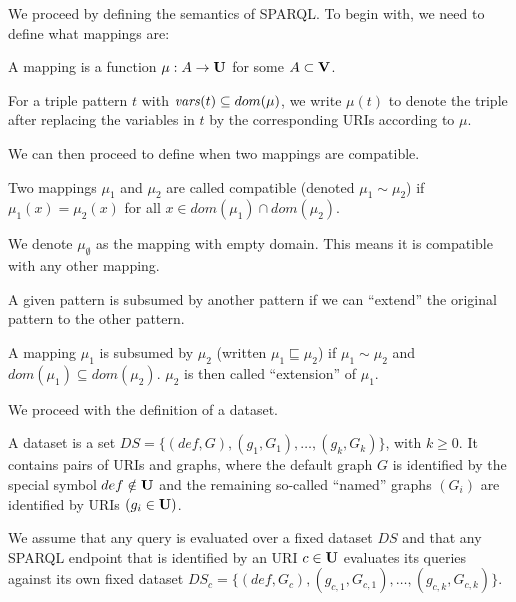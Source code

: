 We proceed by defining the semantics of SPARQL. To begin with, we need to define
what mappings are:
\begin{definition}
	A mapping is a function $\mu: A \rightarrow  \mathbf{U}$ for some $A \subset \mathbf{V}$. 
\end{definition}

For a triple pattern $t$ with $\mathit{vars}(t) \subseteq dom(\mu)$, we write $\mu(t)$ to 
denote the triple after replacing the variables in $t$ by the corresponding 
URIs according to $\mu$. 

We can then proceed to define when two mappings are compatible.
\begin{definition}
	Two mappings $\mu_1$ and $\mu_2$ are called compatible (denoted $\mu_1 \sim \mu_2$) 
	if $\mu_1(x) = \mu_2(x)$ for all $x \in dom(\mu_1) \cap dom(\mu_2)$.
\end{definition}

We denote $\mu_\emptyset$ as the mapping with empty domain. This means it is
compatible with any other mapping.

A given pattern is subsumed by another pattern if we can ``extend'' the original
pattern to the other pattern.
\begin{definition}
	A mapping $\mu_1$ is subsumed by $\mu_2$ (written $\mu_1 \sqsubseteq \mu_2$) 
	if $\mu_1 \sim \mu_2$ and $dom(\mu_1) \subseteq dom(\mu_2)$. $\mu_2$ is then called ``extension'' of $\mu_1$.
\end{definition}

We proceed with the definition of a dataset.
\begin{definition}
	A dataset is a set $DS = \{(def, G), (g_1,G_1), \dots, (g_k, G_k) \}$, with
	$k\geq 0$. It contains pairs of URIs and graphs,
	where the default graph $G$ is identified by the special symbol $def \notin \mathbf{U}$
	and the remaining so-called ``named'' graphs $(G_i)$ are identified by URIs
	$(g_i \in \mathbf{U})$.
\end{definition}
We assume that any query is evaluated over a fixed dataset $DS$
and that any SPARQL endpoint that is identified by an URI $c \in \mathbf{U}$ evaluates
its queries against its own fixed dataset 
$DS_c = \{ (def, G_c),(g_{c,1},G_{c,1}), \dots, (g_{c,k},G_{c,k})\}$.


